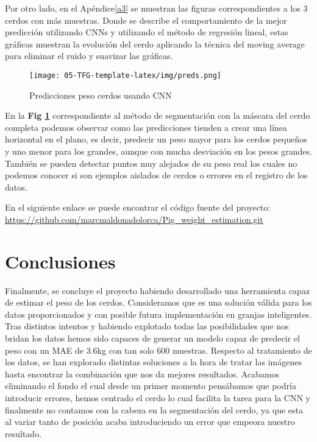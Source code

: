﻿\documentclass[10pt,a4paper,twocolumn,twoside]{article}
\begin{document}
Por otro lado, en el Apéndice\ref{a3} se muestran las figuras correspondientes a los 3 cerdos con más muestras. Donde se describe el comportamiento de la mejor predicción utilizando CNNs y utilizando el método de regresión lineal, estas gráficas muestran la evolución del cerdo aplicando la técnica del moving average para eliminar el ruido y suavizar las gráficas.

    \begin{figure}
    \centering
    \texttt{[image: 05-TFG-template-latex/img/preds.png]}
    \caption{Predicciones peso cerdos usando CNN}
    \label{grafico}
    \end{figure}
    
En la \textbf{Fig \ref{grafico}} correspondiente al método de segmentación con la máscara del cerdo completa podemos observar como las predicciones tienden a crear una línea horizontal en el plano, es decir, predecir un peso mayor para los cerdos pequeños y uno menor para los grandes, aunque con mucha desviación en los pesos grandes. También se pueden detectar puntos muy alejados de su peso real los cuales no podemos conocer si son ejemplos aislados de cerdos o errores en el registro de los datos.

En el siguiente enlace se puede encontrar el código fuente del proyecto:\\
\url{https://github.com/marcmaldonadolorca/Pig_weight_estimation.git}

\section{Conclusiones}

Finalmente, se concluye el proyecto habiendo desarrollado una herramienta capaz de estimar el peso de los cerdos.
Consideramos que es una solución válida para los datos proporcionados y con posible futura implementación en granjas inteligentes.
Tras distintos intentos y habiendo explotado todas las posibilidades que nos bridan los datos hemos sido capaces de generar un modelo capaz de predecir el peso con un MAE de 3.6kg con tan solo 600 muestras.
Respecto al tratamiento de los datos, se han explorado distintas soluciones a la hora de tratar las imágenes hasta encontrar la combinación que nos da mejores resultados. Acabamos eliminando el fondo el cual desde un primer momento pensábamos que podría introducir errores, hemos centrado el cerdo lo cual facilita la tarea para la CNN y finalmente no contamos con la cabeza en la segmentación del cerdo, ya que esta al variar tanto de posición acaba introduciendo un error que empeora nuestro resultado.
\end{document}
